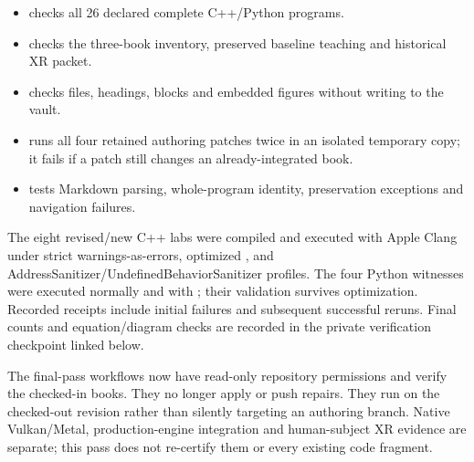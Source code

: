 \begin{itemize}
\tightlist
\item
   checks all 26 declared complete C++/Python programs.
\item
   checks the three-book inventory, preserved baseline teaching and historical XR packet.
\item
   checks files, headings, blocks and embedded figures without writing to the vault.
\item
   runs all four retained authoring patches twice in an isolated temporary copy; it fails if a patch still changes an already-integrated book.
\item
   tests Markdown parsing, whole-program identity, preservation exceptions and navigation failures.
\end{itemize}

The eight revised/new C++ labs were compiled and executed with Apple Clang under strict warnings-as-errors, optimized , and AddressSanitizer/UndefinedBehaviorSanitizer profiles. The four Python witnesses were executed normally and with ; their validation survives optimization. Recorded receipts include initial failures and subsequent successful reruns. Final counts and equation/diagram checks are recorded in the private verification checkpoint linked below.

The final-pass workflows now have read-only repository permissions and verify the checked-in books. They no longer apply or push repairs. They run on the checked-out revision rather than silently targeting an authoring branch. Native Vulkan/Metal, production-engine integration and human-subject XR evidence are separate; this pass does not re-certify them or every existing code fragment.

